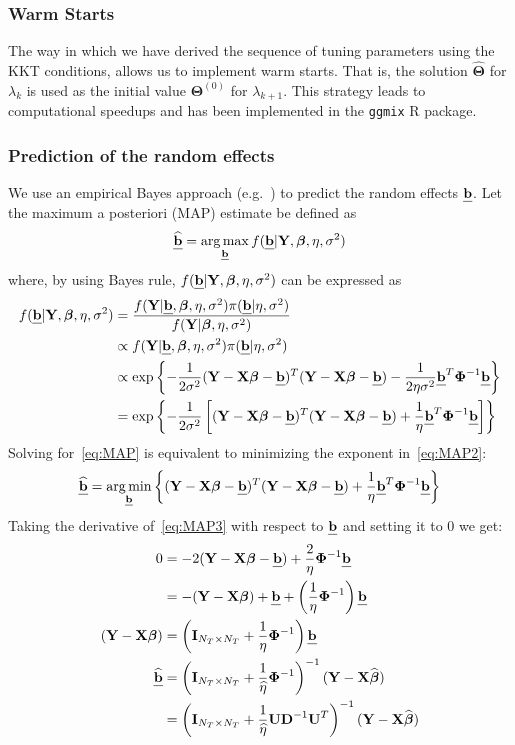 \documentclass[12pt,letter]{article}\usepackage[]{graphicx}\usepackage[]{color}
\newcommand{\bX}{\textbf{X}}
\newcommand{\bY}{\textbf{Y}}
\newcommand{\bD}{\textbf{D}}
\newcommand{\bU}{\textbf{U}}
\newcommand{\bb}{\textbf{\emph{b}}}
\newcommand{\bI}{\textbf{I}}
\newcommand{\bTheta}{\boldsymbol{\Theta}}
\newcommand{\bbeta}{\boldsymbol{\beta}}
\newcommand{\bPhi}{\boldsymbol{\Phi}}
\DeclareMathOperator*{\argmin}{arg\,min}
\DeclareMathOperator*{\argmax}{arg\,max}
\begin{document}
\subsubsection{Warm Starts}
The way in which we have derived the sequence of tuning parameters using the KKT conditions, allows us to implement warm starts. That is, the solution $\widehat{\bTheta}$ for $\lambda_k$ is used as the initial value $\bTheta^{(0)}$ for $\lambda_{k+1}$. This strategy leads to computational speedups and has been implemented in the \texttt{ggmix} R package.


\subsubsection{Prediction of the random effects}
We use an empirical Bayes approach (e.g.~\cite{wakefield2013bayesian}) to predict the random effects $\bb$. Let the maximum a posteriori (MAP) estimate be defined as
\begin{equation}
	\widehat{\bb} = \argmax_{\bb} f(\bb |  \bY, \bbeta, \eta, \sigma^2)  \label{eq:MAP}
\end{equation}
where, by using Bayes rule, $f(\bb |  \bY, \bbeta, \eta, \sigma^2)$ can be expressed as
\begin{align}
	f(\bb |  \bY, \bbeta, \eta, \sigma^2) & = \frac{f(\bY | \bb,  \bbeta, \eta, \sigma^2)  \pi(\bb | \eta, \sigma^2)}{f(\bY |  \bbeta, \eta, \sigma^2)} \nonumber \\
	& \propto f(\bY | \bb,  \bbeta, \eta, \sigma^2)  \pi(\bb | \eta, \sigma^2) \nonumber\\
	& \propto \exp \left\lbrace - \frac{1}{2 \sigma^2} (\bY - \bX \bbeta - \bb)^T  (\bY - \bX \bbeta - \bb) - \frac{1}{2\eta \sigma^2}\bb^T \bPhi^{-1}\bb   \right \rbrace \nonumber\\
	& = \exp \left\lbrace - \frac{1}{2 \sigma^2} \left[  (\bY - \bX \bbeta - \bb)^T (\bY - \bX \bbeta - \bb) + \frac{1}{\eta }\bb^T \bPhi^{-1}\bb \right]    \right \rbrace \label{eq:MAP2}
\end{align}
Solving for~\eqref{eq:MAP} is equivalent to minimizing the exponent in~\eqref{eq:MAP2}:
\begin{align}
	\widehat{\bb} = \argmin_{\bb} \left\lbrace (\bY - \bX \bbeta - \bb)^T  (\bY - \bX \bbeta - \bb) + \frac{1}{\eta }\bb^T \bPhi^{-1}\bb  \right\rbrace \label{eq:MAP3}
\end{align}
Taking the derivative of~\eqref{eq:MAP3} with respect to $\bb$ and setting it to 0 we get:
\begin{align}
	0 & = -2  (\bY - \bX \bbeta - \bb) + \frac{2}{\eta} \bPhi^{-1}\bb \nonumber \\
	& = - (\bY - \bX \bbeta ) + \bb +  \left( \frac{1}{\eta}\bPhi^{-1}\right) \bb  \nonumber\\
	(\bY - \bX \bbeta ) & = \left(\bI_{N_T \times N_T} +  \frac{1}{\eta}\bPhi^{-1}\right) \bb  \nonumber\\
	\widehat{\bb} & = \left( \bI_{N_T \times N_T} +  \frac{1}{\widehat{\eta}}\bPhi^{-1}\right)^{-1}  (\bY - \bX \widehat{\bbeta} ) \nonumber \\
	& = \left( \bI_{N_T \times N_T} +  \frac{1}{\widehat{\eta}} \bU \bD^{-1} \bU^T\right)^{-1}  (\bY - \bX \widehat{\bbeta} )
\end{align}
\end{document}
